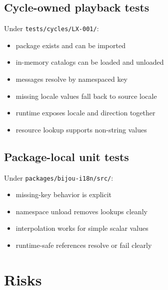 \subsection{Cycle-owned playback tests}\label{record-188-cycle-owned-playback-tests}

Under \texttt{t\allowbreak{}e\allowbreak{}s\allowbreak{}t\allowbreak{}s\allowbreak{}/\allowbreak{}c\allowbreak{}y\allowbreak{}c\allowbreak{}l\allowbreak{}e\allowbreak{}s\allowbreak{}/\allowbreak{}L\allowbreak{}X\allowbreak{}-\allowbreak{}0\allowbreak{}0\allowbreak{}1\allowbreak{}/}:

\begin{itemize}
\tightlist
\item
  package exists and can be imported
\item
  in-memory catalogs can be loaded and unloaded
\item
  messages resolve by namespaced key
\item
  missing locale values fall back to source locale
\item
  runtime exposes locale and direction together
\item
  resource lookup supports non-string values
\end{itemize}

\subsection{Package-local unit tests}\label{record-188-package-local-unit-tests}

Under \texttt{p\allowbreak{}a\allowbreak{}c\allowbreak{}k\allowbreak{}a\allowbreak{}g\allowbreak{}e\allowbreak{}s\allowbreak{}/\allowbreak{}b\allowbreak{}i\allowbreak{}j\allowbreak{}o\allowbreak{}u\allowbreak{}-\allowbreak{}i\allowbreak{}1\allowbreak{}8\allowbreak{}n\allowbreak{}/\allowbreak{}s\allowbreak{}r\allowbreak{}c\allowbreak{}/}:

\begin{itemize}
\tightlist
\item
  missing-key behavior is explicit
\item
  namespace unload removes lookups cleanly
\item
  interpolation works for simple scalar values
\item
  runtime-safe references resolve or fail clearly
\end{itemize}

\section{Risks}\label{record-188-risks}

